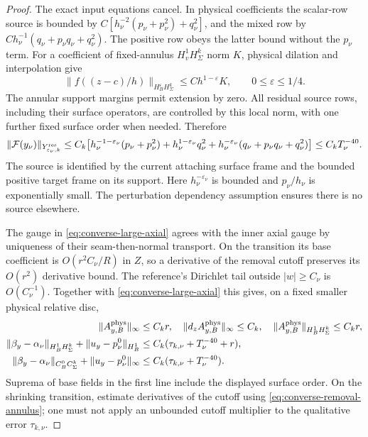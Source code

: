 \documentclass[11pt]{amsart}
\theoremstyle{definition}
\theoremstyle{remark}
\theoremstyle{plain}
\begin{document}
\begin{proof}
The exact input equations cancel. In physical coefficients
the scalar-row source is bounded by
$C[h_\nu^{-2}(p_\nu+p_\nu^2)+q_\nu^2]$, and the mixed row by
$Ch_\nu^{-1}(q_\nu+p_\nu q_\nu+q_\nu^2)$.
The positive row obeys the latter bound without the $p_\nu$ term.
For a coefficient of fixed-annulus $H^1_vH_\Sigma^k$ norm $K$,
physical dilation and interpolation give
\[
                    \|f((z-c)/h)\|_{H_B^\varepsilon H_\Sigma^k}
                                  \leq Ch^{1-\varepsilon}K,
                         \qquad 0\leq\varepsilon\leq1/4.
\]
The annular support margins permit extension by zero.
All residual source rows, including their surface operators,
are controlled by this local norm, with one further fixed
surface order when needed. Therefore
\begin{equation}\label{eq:converse-removal-source}
 \|\mathcal F(y_\nu)\|_{Y^{\rm res}_{\varepsilon_\nu,k}}
 \leq C_k\bigl[
 h_\nu^{-1-\varepsilon_\nu}(p_\nu+p_\nu^2)
 +h_\nu^{1-\varepsilon_\nu}q_\nu^2
 +h_\nu^{-\varepsilon_\nu}(q_\nu+p_\nu q_\nu+q_\nu^2)\bigr]
 \leq C_kT_\nu^{-40}.
\end{equation}
The source is identified by the current attaching surface frame
and the bounded positive target frame on its support.
Here $h_\nu^{-\varepsilon_\nu}$ is bounded and $p_\nu/h_\nu$
is exponentially small. The perturbation dependency assumption
ensures there is no source elsewhere.

The gauge in \eqref{eq:converse-large-axial} agrees with the
inner axial gauge by uniqueness of their seam-then-normal
transport. On the transition its base coefficient is
$O(r^2C_\nu/R)$ in $Z$, so a derivative of the removal cutoff
preserves its $O(r^2)$ derivative bound. The reference's
Dirichlet tail outside $|w|\geq C_\nu$ is $O(C_\nu^{-1})$.
Together with \eqref{eq:converse-large-axial} this gives, on
a fixed smaller physical relative disc,
\begin{equation}\label{eq:converse-erased-local-norm}
\begin{split}
 \|A_{y,B}^{\rm phys}\|_\infty&\leq C_kr,\quad
 \|d_zA_{y,B}^{\rm phys}\|_\infty\leq C_k,\quad
 \|A_{y,B}^{\rm phys}\|_{H_B^1H_\Sigma^k}\leq C_kr,\\
 \|\beta_y-\alpha_\nu\|_{H_B^1H_\Sigma^k}
        +\|u_y-p_\nu^0\|_{H_B^1}
                       &\leq C_k(\tau_{k,\nu}+T_\nu^{-40}+r),\\
 \|\beta_y-\alpha_\nu\|_{C_B^0C_\Sigma^k}
        +\|u_y-p_\nu^0\|_\infty
                       &\leq C_k(\tau_{k,\nu}+T_\nu^{-40}).
\end{split}
\end{equation}
Suprema of base fields in the first line include the displayed
surface order. On the shrinking transition, estimate derivatives
of the cutoff using \eqref{eq:converse-removal-annulus};
one must not apply an unbounded cutoff multiplier to the
qualitative error $\tau_{k,\nu}$.


\end{proof}
\end{document}
